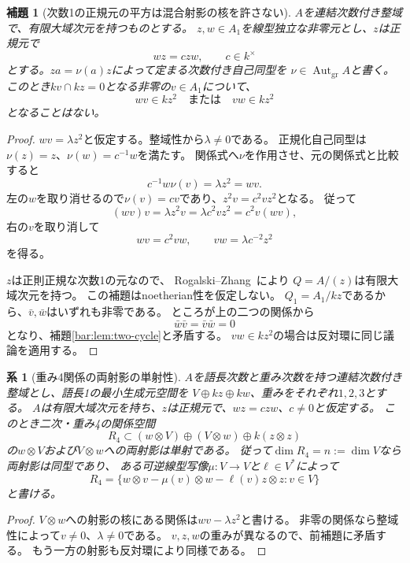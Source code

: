 \documentclass[11pt,a4paper]{ltjsarticle}
\newtheorem{lemma}[theorem]{補題}
\newtheorem{corollary}[theorem]{系}
\theoremstyle{definition}
\begin{document}
\begin{lemma}[次数1の正規元の平方は混合射影の核を許さない]
\label{bar:lem:normal-square}
$A$を連結次数付き整域で、有限大域次元を持つものとする。
$z,w\in A_1$を線型独立な非零元とし、$z$は正規元で
\[
wz=c zw,\qquad c\in k^\times
\]
とする。$z a=\nu(a)z$によって定まる次数付き自己同型を
$\nu\in\operatorname{Aut}_{\mathrm{gr}}A$と書く。
このとき$kv\cap kz=0$となる非零の$v\in A_1$について、
\[
wv\in kz^2\quad\text{または}\quad vw\in kz^2
\]
となることはない。
\end{lemma}
\begin{proof}
$wv=\lambda z^2$と仮定する。整域性から$\lambda\ne0$である。
正規化自己同型は$\nu(z)=z$、$\nu(w)=c^{-1}w$を満たす。
関係式へ$\nu$を作用させ、元の関係式と比較すると
\[
c^{-1}w\nu(v)=\lambda z^2=wv.
\]
左の$w$を取り消せるので$\nu(v)=cv$であり、$z^2v=c^2vz^2$となる。
従って
\[
(wv)v=\lambda z^2v=\lambda c^2vz^2=c^2v(wv),
\]
右の$v$を取り消して
\[
wv=c^2vw,\qquad vw=\lambda c^{-2}z^2
\]
を得る。

$z$は正則正規な次数1の元なので、
Rogalski--Zhang~\cite[Lemma~1.1]{RZ}により
$Q=A/(z)$は有限大域次元を持つ。
この補題はnoetherian性を仮定しない。
$Q_1=A_1/kz$であるから、$\bar v,\bar w$はいずれも非零である。
ところが上の二つの関係から
\[
\bar w\bar v=\bar v\bar w=0
\]
となり、補題\ref{bar:lem:two-cycle}と矛盾する。
$vw\in kz^2$の場合は反対環に同じ議論を適用する。
\end{proof}

\begin{corollary}[重み4関係の両射影の単射性]
\label{bar:cor:mixed-projections}
$A$を語長次数と重み次数を持つ連結次数付き整域とし、語長1の最小生成元空間を
$V\oplus kz\oplus kw$、重みをそれぞれ$1,2,3$とする。
$A$は有限大域次元を持ち、$z$は正規元で、$wz=c zw$、$c\ne0$と仮定する。
このとき二次・重み4の関係空間
\[
R_4\subset (w\otimes V)\oplus(V\otimes w)\oplus k(z\otimes z)
\]
の$w\otimes V$および$V\otimes w$への両射影は単射である。
従って$\dim R_4=n:=\dim V$なら両射影は同型であり、
ある可逆線型写像$\mu:V\to V$と$\ell\in V^*$によって
\[
R_4=\{w\otimes v-\mu(v)\otimes w-\ell(v)z\otimes z:v\in V\}
\]
と書ける。
\end{corollary}
\begin{proof}
$V\otimes w$への射影の核にある関係は$wv-\lambda z^2$と書ける。
非零の関係なら整域性によって$v\ne0$、$\lambda\ne0$である。
$v,z,w$の重みが異なるので、前補題に矛盾する。
もう一方の射影も反対環により同様である。
\end{proof}
\end{document}
